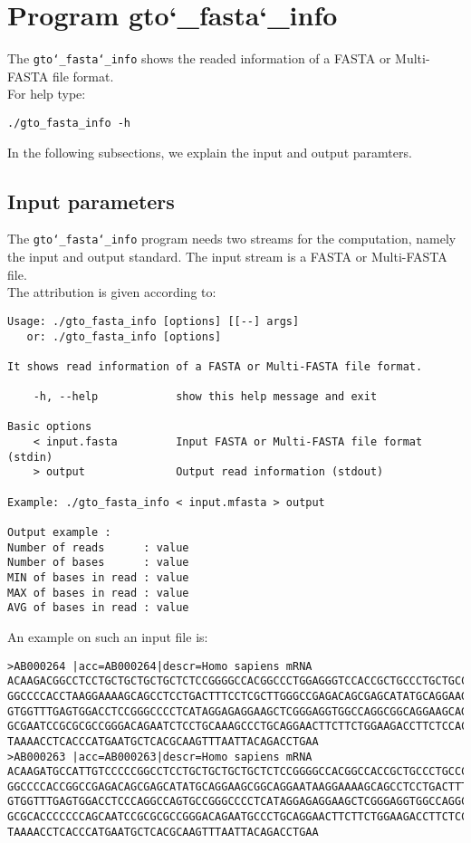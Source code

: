 \section{Program gto\char`_fasta\char`_info}
The \texttt{gto\char`_fasta\char`_info} shows the readed information of a FASTA or Multi-FASTA file format.\\
For help type:
\begin{lstlisting}
./gto_fasta_info -h
\end{lstlisting}
In the following subsections, we explain the input and output paramters.

\subsection*{Input parameters}

The \texttt{gto\char`_fasta\char`_info} program needs two streams for the computation, namely the input and output standard. The input stream is a FASTA or Multi-FASTA file.\\
The attribution is given according to:
\begin{lstlisting}
Usage: ./gto_fasta_info [options] [[--] args]
   or: ./gto_fasta_info [options]

It shows read information of a FASTA or Multi-FASTA file format.

    -h, --help            show this help message and exit

Basic options
    < input.fasta         Input FASTA or Multi-FASTA file format (stdin)
    > output              Output read information (stdout)

Example: ./gto_fasta_info < input.mfasta > output

Output example :
Number of reads      : value
Number of bases      : value
MIN of bases in read : value
MAX of bases in read : value
AVG of bases in read : value
\end{lstlisting}
An example on such an input file is:
\begin{lstlisting}
>AB000264 |acc=AB000264|descr=Homo sapiens mRNA 
ACAAGACGGCCTCCTGCTGCTGCTGCTCTCCGGGGCCACGGCCCTGGAGGGTCCACCGCTGCCCTGCTGCCATTGTCCCC
GGCCCCACCTAAGGAAAAGCAGCCTCCTGACTTTCCTCGCTTGGGCCGAGACAGCGAGCATATGCAGGAAGCGGCAGGAA
GTGGTTTGAGTGGACCTCCGGGCCCCTCATAGGAGAGGAAGCTCGGGAGGTGGCCAGGCGGCAGGAAGCAGGCCAGTGCC
GCGAATCCGCGCGCCGGGACAGAATCTCCTGCAAAGCCCTGCAGGAACTTCTTCTGGAAGACCTTCTCCACCCCCCCAGC
TAAAACCTCACCCATGAATGCTCACGCAAGTTTAATTACAGACCTGAA
>AB000263 |acc=AB000263|descr=Homo sapiens mRNA 
ACAAGATGCCATTGTCCCCCGGCCTCCTGCTGCTGCTGCTCTCCGGGGCCACGGCCACCGCTGCCCTGCCCCTGGAGGGT
GGCCCCACCGGCCGAGACAGCGAGCATATGCAGGAAGCGGCAGGAATAAGGAAAAGCAGCCTCCTGACTTTCCTCGCTTG
GTGGTTTGAGTGGACCTCCCAGGCCAGTGCCGGGCCCCTCATAGGAGAGGAAGCTCGGGAGGTGGCCAGGCGGCAGGAAG
GCGCACCCCCCCAGCAATCCGCGCGCCGGGACAGAATGCCCTGCAGGAACTTCTTCTGGAAGACCTTCTCCTCCTGCAAA
TAAAACCTCACCCATGAATGCTCACGCAAGTTTAATTACAGACCTGAA
\end{lstlisting}

